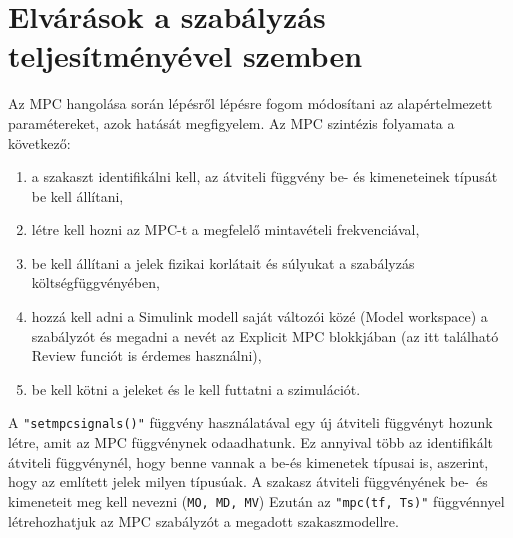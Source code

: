 \section{Elvárások a szabályzás teljesítményével szemben}

Az MPC hangolása során %
lépésről lépésre fogom módosítani az alapértelmezett paramétereket, azok hatását megfigyelem.
Az MPC szintézis folyamata a következő:%


\begin{enumerate}[noitemsep,topsep=0pt,parsep=2pt,partopsep=4pt,leftmargin=30pt]
	\item a szakaszt identifikálni kell, az átviteli függvény be- és kimeneteinek típusát be kell állítani,
	\item létre kell hozni az MPC-t a megfelelő mintavételi frekvenciával,
	\item be kell állítani a jelek fizikai korlátait és súlyukat a szabályzás költségfüggvényében,
	\item hozzá kell adni a Simulink modell saját változói közé (Model workspace) a szabályzót és megadni a nevét az Explicit MPC blokkjában (az itt található Review funciót is érdemes használni),
	\item be kell kötni a jeleket és le kell futtatni a szimulációt.
	
\end{enumerate}


A \verb|"setmpcsignals()"| függvény használatával egy új átviteli függvényt hozunk létre, amit az MPC függvénynek odaadhatunk. Ez annyival több az identifikált átviteli függvénynél, hogy benne vannak a be-és kimenetek típusai is, aszerint, hogy az említett jelek milyen típusúak. A szakasz átviteli függvényének be-~és kimeneteit meg kell nevezni (\verb|MO, MD, MV|) Ezután az \verb|"mpc(tf, Ts)"| függvénnyel létrehozhatjuk az MPC szabályzót a megadott szakaszmodellre.



%
%
%
%
%



